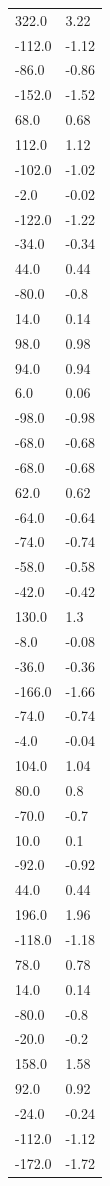 \begin{longtable}{ll}
322.0 & 3.22 \\
-112.0 & -1.12 \\
-86.0 & -0.86 \\
-152.0 & -1.52 \\
68.0 & 0.68 \\
112.0 & 1.12 \\
-102.0 & -1.02 \\
-2.0 & -0.02 \\
-122.0 & -1.22 \\
-34.0 & -0.34 \\
44.0 & 0.44 \\
-80.0 & -0.8 \\
14.0 & 0.14 \\
98.0 & 0.98 \\
94.0 & 0.94 \\
6.0 & 0.06 \\
-98.0 & -0.98 \\
-68.0 & -0.68 \\
-68.0 & -0.68 \\
62.0 & 0.62 \\
-64.0 & -0.64 \\
-74.0 & -0.74 \\
-58.0 & -0.58 \\
-42.0 & -0.42 \\
130.0 & 1.3 \\
-8.0 & -0.08 \\
-36.0 & -0.36 \\
-166.0 & -1.66 \\
-74.0 & -0.74 \\
-4.0 & -0.04 \\
104.0 & 1.04 \\
80.0 & 0.8 \\
-70.0 & -0.7 \\
10.0 & 0.1 \\
-92.0 & -0.92 \\
44.0 & 0.44 \\
196.0 & 1.96 \\
-118.0 & -1.18 \\
78.0 & 0.78 \\
14.0 & 0.14 \\
-80.0 & -0.8 \\
-20.0 & -0.2 \\
158.0 & 1.58 \\
92.0 & 0.92 \\
-24.0 & -0.24 \\
-112.0 & -1.12 \\
-172.0 & -1.72 \\

\end{longtable}
